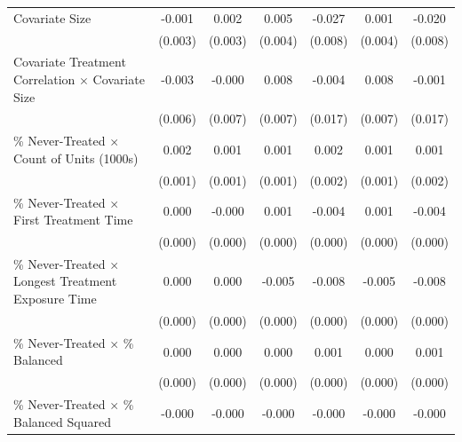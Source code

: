 \documentclass[12pt]{article}
\begin{document}
\begin{table}[htbp]
{\begin{tabular}{p{4.5in}|*{6}{c}}
Covariate Size      &      -0.001         &       0.002         &       0.005         &      -0.027\sym{**} &       0.001         &      -0.020\sym{*}  \\
                    &     (0.003)         &     (0.003)         &     (0.004)         &     (0.008)         &     (0.004)         &     (0.008)         \\
Covariate Treatment Correlation $\times$ Covariate Size&      -0.003         &      -0.000         &       0.008         &      -0.004         &       0.008         &      -0.001         \\
                    &     (0.006)         &     (0.007)         &     (0.007)         &     (0.017)         &     (0.007)         &     (0.017)         \\
\% Never-Treated $\times$ Count of Units (1000s)&       0.002\sym{*}  &       0.001         &       0.001         &       0.002         &       0.001         &       0.001         \\
                    &     (0.001)         &     (0.001)         &     (0.001)         &     (0.002)         &     (0.001)         &     (0.002)         \\
\% Never-Treated $\times$ First Treatment Time&       0.000         &      -0.000         &       0.001\sym{***}&      -0.004\sym{***}&       0.001\sym{***}&      -0.004\sym{***}\\
                    &     (0.000)         &     (0.000)         &     (0.000)         &     (0.000)         &     (0.000)         &     (0.000)         \\
\% Never-Treated $\times$ Longest Treatment Exposure Time&       0.000\sym{*}  &       0.000\sym{***}&      -0.005\sym{***}&      -0.008\sym{***}&      -0.005\sym{***}&      -0.008\sym{***}\\
                    &     (0.000)         &     (0.000)         &     (0.000)         &     (0.000)         &     (0.000)         &     (0.000)         \\
\% Never-Treated $\times$ \% Balanced&       0.000\sym{***}&       0.000\sym{***}&       0.000         &       0.001\sym{***}&       0.000\sym{*}  &       0.001\sym{***}\\
                    &     (0.000)         &     (0.000)         &     (0.000)         &     (0.000)         &     (0.000)         &     (0.000)         \\
\% Never-Treated $\times$ \% Balanced Squared&      -0.000\sym{***}&      -0.000\sym{***}&      -0.000\sym{**} &      -0.000\sym{***}&      -0.000\sym{**} &      -0.000\sym{***}\\

\end{tabular}}
\end{table}
\end{document}
